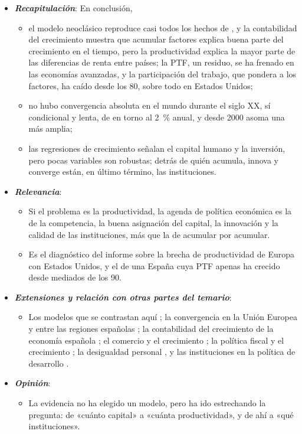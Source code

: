 \documentclass[11pt]{article}
\begin{document}
\begin{itemize}
\item \textbf{\emph{Recapitulación}}: En conclusión,
  \begin{itemize}
  \item el modelo neoclásico reproduce casi todos los hechos de , y la contabilidad del crecimiento muestra que acumular factores explica buena parte del crecimiento en el tiempo, pero la productividad explica la mayor parte de las diferencias de renta entre países; la PTF, un residuo, se ha frenado en las economías avanzadas, y la participación del trabajo, que pondera a los factores, ha caído desde los 80, sobre todo en Estados Unidos;
  \item no hubo convergencia absoluta en el mundo durante el siglo XX, sí condicional y lenta, de en torno al 2~\% anual, y desde 2000 asoma una más amplia;
  \item las regresiones de crecimiento señalan el capital humano y la inversión, pero pocas variables son robustas; detrás de quién acumula, innova y converge están, en último término, las instituciones.
  \end{itemize}
\item \textbf{\emph{Relevancia}}:
  \begin{itemize}
  \item Si el problema es la productividad, la agenda de política económica es la de la competencia, la buena asignación del capital, la innovación y la calidad de las instituciones, más que la de acumular por acumular.

  \item Es el diagnóstico del informe  sobre la brecha de productividad de Europa con Estados Unidos\nocite{CE2024Draghi}, y el de una España cuya PTF apenas ha crecido desde mediados de los 90.
  \end{itemize}
\item \textbf{\emph{Extensiones y relación con otras partes del temario}}:
  \begin{itemize}
  \item Los modelos que se contrastan aquí  ; la convergencia en la Unión Europea y entre las regiones españolas  ; la contabilidad del crecimiento de la economía española ; el comercio y el crecimiento ; la política fiscal y el crecimiento ; la desigualdad personal  , y las instituciones en la política de desarrollo .
  \end{itemize}
\item \textbf{\emph{Opinión}}:
  \begin{itemize}
  \item La evidencia no ha elegido un modelo, pero ha ido estrechando la pregunta: de «cuánto capital» a «cuánta productividad», y de ahí a «qué instituciones».


\end{itemize}
\end{itemize}
\end{document}
